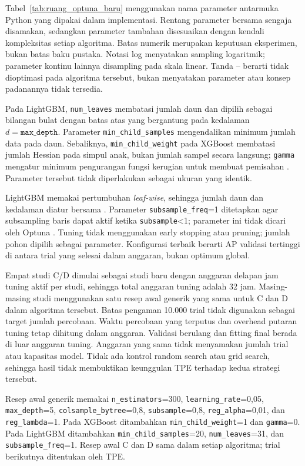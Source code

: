 Tabel~\ref{tab:ruang_optuna_baru} menggunakan nama parameter antarmuka Python yang dipakai dalam implementasi. Rentang parameter bersama sengaja disamakan, sedangkan parameter tambahan disesuaikan dengan kendali kompleksitas setiap algoritma. Batas numerik merupakan keputusan eksperimen, bukan batas baku pustaka. Notasi log menyatakan sampling logaritmik; parameter kontinu lainnya disampling pada skala linear. Tanda -- berarti tidak dioptimasi pada algoritma tersebut, bukan menyatakan parameter atau konsep padanannya tidak tersedia.

Pada LightGBM, \texttt{num\_leaves} membatasi jumlah daun dan dipilih sebagai bilangan bulat dengan batas atas yang bergantung pada kedalaman $d=\texttt{max\_depth}$. Parameter \texttt{min\_child\_samples} mengendalikan minimum jumlah data pada daun. Sebaliknya, \texttt{min\_child\_weight} pada XGBoost membatasi jumlah Hessian pada simpul anak, bukan jumlah sampel secara langsung; \texttt{gamma} mengatur minimum pengurangan fungsi kerugian untuk membuat pemisahan \cite{chen2016,lightgbmparameters2026}. Parameter tersebut tidak diperlakukan sebagai ukuran yang identik.

LightGBM memakai pertumbuhan \textit{leaf-wise}, sehingga jumlah daun dan kedalaman diatur bersama \cite{lightgbmtuning2026}. Parameter \texttt{subsample\_freq}=1 ditetapkan agar subsampling baris dapat aktif ketika \texttt{subsample}<1; parameter ini tidak dicari oleh Optuna \cite{lightgbmparameters2026}. Tuning tidak menggunakan early stopping atau pruning; jumlah pohon dipilih sebagai parameter. Konfigurasi terbaik berarti AP validasi tertinggi di antara trial yang selesai dalam anggaran, bukan optimum global.

Empat studi C/D dimulai sebagai studi baru dengan anggaran delapan jam tuning aktif per studi, sehingga total anggaran tuning adalah 32 jam. Masing-masing studi menggunakan satu resep awal generik yang sama untuk C dan D dalam algoritma tersebut. Batas pengaman 10.000 trial tidak digunakan sebagai target jumlah percobaan. Waktu percobaan yang terputus dan overhead putaran tuning tetap dihitung dalam anggaran. Validasi berulang dan fitting final berada di luar anggaran tuning. Anggaran yang sama tidak menyamakan jumlah trial atau kapasitas model. Tidak ada kontrol random search atau grid search, sehingga hasil tidak membuktikan keunggulan TPE terhadap kedua strategi tersebut.

Resep awal generik memakai \texttt{n\_estimators}=300, \texttt{learning\_rate}=0,05, \texttt{max\_depth}=5, \texttt{colsample\_bytree}=0,8, \texttt{subsample}=0,8, \texttt{reg\_alpha}=0,01, dan \texttt{reg\_lambda}=1. Pada XGBoost ditambahkan \texttt{min\_child\_weight}=1 dan \texttt{gamma}=0. Pada LightGBM ditambahkan \texttt{min\_child\_samples}=20, \texttt{num\_leaves}=31, dan \texttt{subsample\_freq}=1. Resep awal C dan D sama dalam setiap algoritma; trial berikutnya ditentukan oleh TPE.

